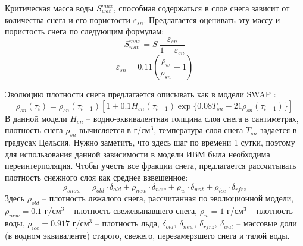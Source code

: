 \documentclass[a4paper, fontsize=12pt]{scrartcl}
\begin{document}
Критическая масса воды $S_{wat}^{max}$, способная содержаться в слое снега зависит от количества снега и его пористости $\varepsilon_{sn}$. Предлагается оценивать эту массу \cite{Gusev2002} и пористость снега \cite{Stock} по следующим формулам:
\begin{equation}
     S_{wat}^{max} = S ~\dfrac{\varepsilon_{sn}}{1 - \varepsilon_{sn}}  \label{sys}  
\end{equation}
\begin{equation}
    \varepsilon_{sn} = 0.11 \left( \dfrac{\rho_w}{\rho_{sn}} - 1 \right)  \label{sys}  
\end{equation}

Эволюцию плотности снега предлагается описывать как в модели SWAP \cite{Gusev2002, Yosida1955}:
\begin{equation}
    \rho_{sn}(\tau_i) = \rho_{sn}(\tau_{i-1}) \left[  1 + 0.1 H_{sn}(\tau_{i-1}) \exp \{ 0.08 T_{sn} - 21 \rho_{sn}(\tau_{i-1})  \} \right]    \label{sysRHOOLD}  
\end{equation}
В данной модели $H_{sn}$ -- водно-эквивалентная толщина слоя снега в сантиметрах, плотность снега $\rho_{sn}$ вычисляется в г/см$^3$, температура слоя снега $T_{sn}$ задается в градусах Цельсия. Нужно заметить, что здесь шаг по времени 1 сутки, поэтому для использования данной зависимости в модели ИВМ была необходима переинтерполяция. Чтобы учесть все фракции снега, предлагается рассчитывать плотность снежного слоя как среднее взвешенное:
\begin{equation}
    \rho_{snow} = \rho_{old} \cdot \delta_{old} + \rho_{new} \cdot \delta_{new} + \rho_{w} \cdot \delta_{wat} + \rho_{ice} \cdot \delta_{rfrz}
\end{equation}
Здесь $\rho_{old}$ -- плотность лежалого снега, рассчитанная по эволюционной модели,  $\rho_{new} = 0.1$ г/см$^3$ -- плотность свежевыпавшего снега, $\rho_{w} = 1$ г/см$^3$ -- плотность воды, $\rho_{ice} = 0.917$ г/см$^3$ -- плотность льда, $\delta_{old}, ~\delta_{new}, ~\delta_{rfrz}, ~ \delta_{wat}$  -- массовые доли (в водном эквиваленте) старого, свежего, перезамерзшего снега и талой воды.
\end{document}
